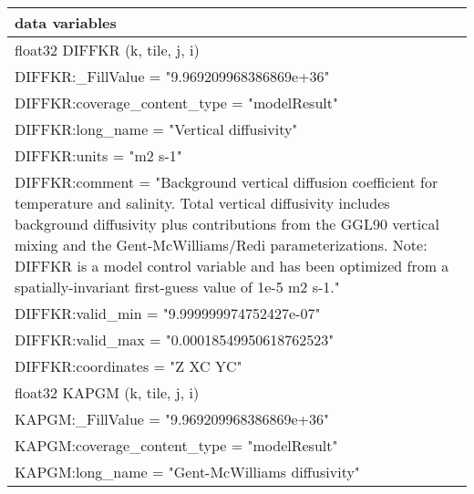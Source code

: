 \begin{longtable}{|p{\textwidth}|}
data variables\\
\hline
\hspace{0.5cm}float32 DIFFKR (k, tile, j, i)\\
\hspace{0.5cm}\hspace{0.5cm}DIFFKR:\_FillValue = "9.969209968386869e+36"\\
\hspace{0.5cm}\hspace{0.5cm}DIFFKR:coverage\_content\_type = "modelResult"\\
\hspace{0.5cm}\hspace{0.5cm}DIFFKR:long\_name = "Vertical diffusivity"\\
\hspace{0.5cm}\hspace{0.5cm}DIFFKR:units = "m2 s-1"\\
\hspace{0.5cm}\hspace{0.5cm}DIFFKR:comment = "Background vertical diffusion coefficient for temperature and salinity. Total vertical diffusivity includes background diffusivity plus contributions from the GGL90 vertical mixing and the Gent-McWilliams/Redi parameterizations. Note: DIFFKR is a model control variable and has been optimized from a spatially-invariant first-guess value of 1e-5 m2 s-1."\\
\hspace{0.5cm}\hspace{0.5cm}DIFFKR:valid\_min = "9.999999974752427e-07"\\
\hspace{0.5cm}\hspace{0.5cm}DIFFKR:valid\_max = "0.00018549950618762523"\\
\hspace{0.5cm}\hspace{0.5cm}DIFFKR:coordinates = "Z XC YC"\\
\hspace{0.5cm}float32 KAPGM (k, tile, j, i)\\
\hspace{0.5cm}\hspace{0.5cm}KAPGM:\_FillValue = "9.969209968386869e+36"\\
\hspace{0.5cm}\hspace{0.5cm}KAPGM:coverage\_content\_type = "modelResult"\\
\hspace{0.5cm}\hspace{0.5cm}KAPGM:long\_name = "Gent-McWilliams diffusivity"\\

\end{longtable}
